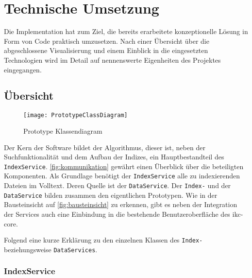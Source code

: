 \chapter{Technische Umsetzung} \label{implementation}

Die Implementation hat zum Ziel, die bereits erarbeitete konzeptionelle Lösung in Form von Code praktisch umzusetzen. Nach einer Übersicht über die abgeschlossene Visualisierung und einem Einblick in die eingesetzten Technologien wird im Detail auf nennenswerte Eigenheiten des Projektes eingegangen.


\section{Übersicht}


    \begin{figure}[H]
    \centering
    \texttt{[image: PrototypeClassDiagram]}
    \caption{Prototype Klassendiagram}
    \label{fig:prototypeClassDiagram}
    \end{figure}

Der Kern der Software bildet der Algorithmus, dieser ist, neben der Suchfunktionalität und dem Aufbau der Indizes, ein Hauptbestandteil des \texttt{IndexService}. \autoref{fig:kommunikation} gewährt einen Überblick über die beteiligten Komponenten. Als Grundlage benötigt der \texttt{In\-dex\-Ser\-vice} alle zu indexierenden Dateien im Volltext. Deren Quelle ist der \texttt{Data\-Ser\-vice}. Der \texttt{Index-} und der \texttt{DataService} bilden zusammen den eigentlichen Prototypen. Wie in der Bausteinsicht auf \autoref{fig:bausteinsicht} zu erkennen, gibt es neben der Integration der Services auch eine Einbindung in die bestehende Benutzeroberfläche des \gls{ikc-core}.

Folgend eine kurze Erklärung zu den einzelnen Klassen des \texttt{Index-} beziehungsweise \texttt{DataServices}.


\subsection{IndexService}

